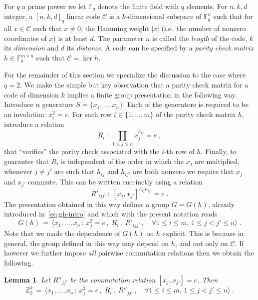 \documentclass[11pt]{article}
\newtheorem{lemma}[theorem]{Lemma}
\theoremstyle{definition}
\newcommand{\code}{\mathscr{C}}
\newcommand{\F}{\ensuremath{\mathbb{F}}}
\newcommand{\Z}{\ensuremath{\mathbb{Z}}}
\begin{document}
\label{sec:pres-code}

For $q$ a prime power we let $\F_q$ denote the finite field with $q$ elements. 
For $n,k,d$ integer, a $[n,k,d]_q$ linear code $\code$ is a $k$-dimensional subspace of $\F_q^n$ such that for all $x\in \code$ such that $x\neq 0$, the Hamming weight $|x|$ (i.e.\ the number of nonzero coordinates of $x$) is at least $d$. The parameter $n$ is called the \emph{length} of the code, $k$ its \emph{dimension} and $d$ its \emph{distance}. A code can be specified by a \emph{parity check matrix} $h\in \F_q^{m\times n}$ such that $\code = \ker h$. 

For the remainder of this section we specialize the discussion to the case where $q=2$. 
We make the simple but key observation that a parity check matrix for a code of dimension $k$ implies a finite group presentation in the following way. Introduce $n$ generators $S=\{x_1,\ldots,x_n\}$. Each of the generators is required to be an involution: $x_i^2=e$. For each row $i\in \{1,\ldots,m\}$ of the parity check matrix $h$, introduce a relation 
\[ R_i\,:\; \prod_{1\leq j \leq n} x_j^{h_{ij}}=e\;, \]
that ``verifies'' the parity check associated with the $i$-th row of $h$. Finally, to guarantee that $R_i$ is independent of the order in which the $x_j$ are multiplied, whenever $j\neq j'$ are such that $h_{ij}$ and $h_{ij'}$ are both nonzero we require that $x_j$ and $x_{j'}$ commute. This can be written succinctly using a relation 
\[ R'_{ijj'}\,:\; [x_j,x_{j'}]^{h_{ij} h_{ij'}}=e\;.\]
The presentation obtained in this way defines a group $G=G(h)$, already introduced in~\eqref{eq:gh-intro} and which with the present notation reads
\begin{equation}\label{eq:def-gh-pres}
 G(h) \,=\, \big\langle x_1,\ldots,x_n \,:\, x_j^2=e\,,\; R_i\,,\; R'_{ijj'}\,,\quad \forall 1\leq i\leq m,\, 1\leq j< j' \leq n\big\rangle\;.
\end{equation}
Note that we made the dependence of $G(h)$ on $h$ explicit. This is because in general, the group defined in this way may depend on $h$, and not only on $\code$. If however we further impose \emph{all} pairwise commutation relations then we obtain the following. 

\begin{lemma}\label{lem:com-code}
Let $R''_{jj'}$ be the commutation relation $[x_j,x_{j'}]=e$. Then
\[ \Z_2^k \,=\, \big\langle x_1,\ldots,x_n \,:\, x_j^2=e\,,\; R_i\,,\; R''_{jj'}\,,\quad \forall 1\leq i\leq m,\, 1\leq j< j' \leq n\big\rangle\;.\]
\end{lemma}
\end{document}

